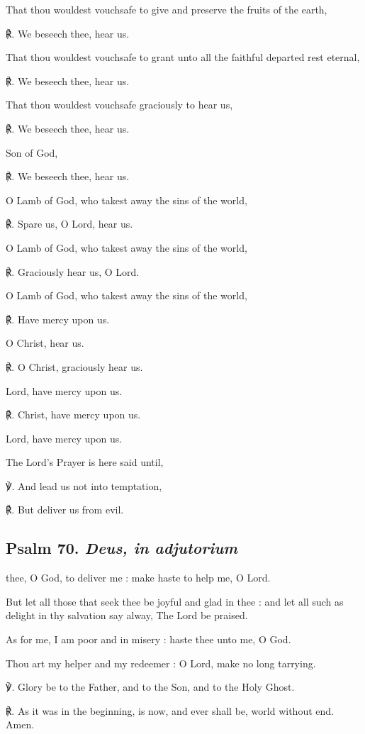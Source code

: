 \begin{multicols}{2}
That thou wouldest vouchsafe to give and preserve the fruits of the earth,\par
℟. We beseech thee, hear us.\par\noindent
That thou wouldest vouchsafe to grant unto all the faithful departed {} rest eternal,\par
℟. We beseech thee, hear us.\par\noindent
That thou wouldest vouchsafe graciously to hear us,\par
℟. We beseech thee, hear us.\par\noindent
Son of God,\par
℟. We beseech thee, hear us.\par\noindent
O Lamb of God, who takest away the sins of the world,\par
℟. Spare us, O Lord, hear us.\par\noindent
O Lamb of God, who takest away the sins of the world,\par
℟. Graciously hear us, O Lord.\par\noindent
O Lamb of God, who takest away the sins of the world,\par
℟. Have mercy upon us.\par\noindent
O Christ, hear us.\par
℟. O Christ, graciously hear us.\par\noindent
Lord, have mercy upon us.\par
℟. Christ, have mercy upon us.\par\noindent
Lord, have mercy upon us.
\end{multicols}

\begin{rubric}
    {The Lord's Prayer is here said until,}
\end{rubric}

℣. And lead us not into temptation,

℟. But deliver us from evil.

\subsection{Psalm 70. \textit{Deus, in adjutorium}}
 thee, O God, to deliver me : make haste to help me, O Lord.\par
{}
But let all those that seek thee be joyful and glad in thee : and let all such as delight in thy salvation say alway, The Lord be praised.\par
{}As for me, I am poor and in misery : haste thee unto me, O God.\par
{}Thou art my helper and my redeemer : O Lord, make no long tarrying.\par
℣. Glory be to the Father, and to the Son, and to the Holy Ghost.\par
℟. As it was in the beginning, is now, and ever shall be, world without end. Amen.

